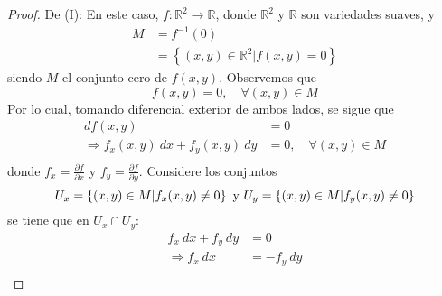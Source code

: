 \documentclass[12pt]{report}
\theoremstyle{largebreak}
\newcommand\cf[3]{\ensuremath{#1:#2\rightarrow#3}}
\begin{document}
\begin{proof}
        De (I): En este caso, $\cf{f}{\mathbb{R}^2}{\mathbb{R}}$, donde $\mathbb{R}^2$ y $\mathbb{R}$ son variedades suaves, y
        \begin{equation*}
            \begin{split}
                M&=f^{-1}(0)\\
                &=\left\{(x,y)\in\mathbb{R}^2|f(x,y)=0\right\}
            \end{split}
        \end{equation*}
        siendo $M$ el conjunto cero de $f(x,y)$. Observemos que
        \begin{equation*}
            f(x,y)=0,\quad\forall (x,y)\in M
        \end{equation*}
        Por lo cual, tomando diferencial exterior de ambos lados, se sigue que
        \begin{equation*}
            \begin{split}
                df(x,y)&=0\\
                \Rightarrow f_x(x,y)\:dx+f_y(x,y)\:dy&=0,\quad\forall (x,y)\in M\\
            \end{split}
        \end{equation*}
        donde $f_x=\frac{\partial f}{\partial x}$ y $f_y=\frac{\partial f}{\partial y}$. Considere los conjuntos
        \begin{equation*}
            U_x=\left\{(x,y)\in M|f_x(x,y)\neq 0\right\}\textup{ y }U_y=\left\{(x,y)\in M|f_y(x,y)\neq 0\right\}
        \end{equation*}
        se tiene que en $U_x\cap U_y$:
        \begin{equation}
            \begin{split}
                f_x\:dx+f_y\:dy&=0\\
                \Rightarrow f_x\:dx&=-f_y\:dy\\
            \end{split}
        \end{equation}


\end{proof}
\end{document}
